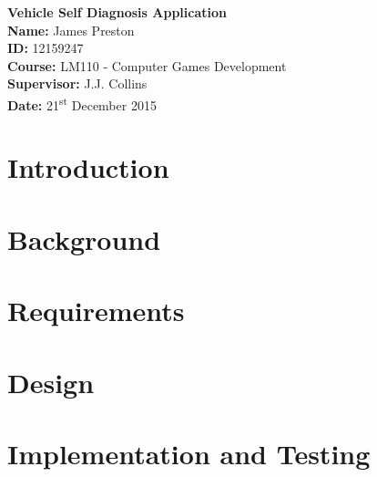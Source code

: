 \documentclass[12pt]{report}
\begin{document}
\begin{titlepage}
	\begin{center}		
		\vspace*{5cm}
		\textbf{\LARGE{Vehicle Self Diagnosis Application}}\\
		\vspace{6cm}
		\large{		
		\textbf{Name:} James Preston\\
		\textbf{ID:} 12159247\\
		\textbf{Course:} LM110 - Computer Games Development\\
		\textbf{Supervisor:} J.J. Collins\\
		\textbf{Date:} 21\textsuperscript{st} December 2015 \\
		}
	\end{center}
\end{titlepage}

	\tableofcontents
	\newpage
	
	\chapter{Introduction}
		
	\newpage 
	
	\chapter{Background}
		
	\newpage

	\chapter{Requirements}
		
	\newpage	

	\chapter{Design}
		
	\newpage
	
	\chapter{Implementation and Testing}
		
	\newpage
	
	
	
\end{document}
